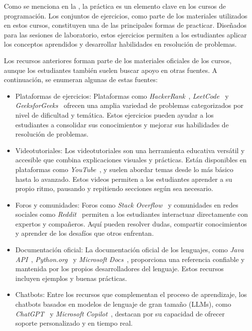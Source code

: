 Como se menciona en la , la práctica es un elemento clave en los cursos de programación. Los conjuntos de ejercicios, como parte de los materiales utilizados en estos cursos, constituyen una de las principales formas de practicar. Diseñados para las sesiones de laboratorio, estos ejercicios permiten a los estudiantes aplicar los conceptos aprendidos y desarrollar habilidades en resolución de problemas.

Los recursos anteriores forman parte de los materiales oficiales de los cursos, aunque los estudiantes también suelen buscar apoyo en otras fuentes. A continuación, se enumeran algunas de estas fuentes:

\begin{itemize}
    \item Plataformas de ejercicios: 
    Plataformas como \textit{HackerRank}~\cite{hackerrank}, \textit{LeetCode}~\cite{leetcode}  y \textit{GeeksforGeeks}~\cite{geeksforgeeks} ofrecen una amplia variedad de problemas categorizados por nivel de dificultad y temática. Estos ejercicios pueden ayudar a los estudiantes a consolidar sus conocimientos y mejorar sus habilidades de resolución de problemas.

    \item Videotutoriales:
    Los videotutoriales son una herramienta educativa versátil y accesible que combina explicaciones visuales y prácticas. Están disponibles en plataformas como \textit{YouTube}~\cite{youtube}, y suelen abordar temas desde lo más básico hasta lo avanzado. Estos videos permiten a los estudiantes aprender a su propio ritmo, pausando y repitiendo secciones según sea necesario.

    \item Foros y comunidades: 
    Foros como \textit{Stack Overflow}~\cite{stackoverflow} y comunidades en redes sociales como \textit{Reddit}~\cite{reddit} permiten a los estudiantes interactuar directamente con expertos y compañeros. Aquí pueden resolver dudas, compartir conocimientos y aprender de los desafíos que otros enfrentan.
    
    \item Documentación oficial:
    La documentación oficial de los lenguajes, como  \textit{Java API}~\cite{java-api}, \textit{Python.org}~\cite{python} y \textit{Microsoft Docs}~\cite{microsoft-docs}, proporciona una referencia confiable y mantenida por los propios desarrolladores del lenguaje. Estos recursos incluyen ejemplos y buenas prácticas.
    
    \item Chatbots: 
    Entre los recursos que complementan el proceso de aprendizaje, los chatbots basados en modelos de lenguaje de gran tamaño (LLMs), como \textit{ChatGPT}~\cite{chatgpt} y \textit{Microsoft Copilot}~\cite{copilot}, destacan por su capacidad de ofrecer soporte personalizado y en tiempo real.
\end{itemize}


